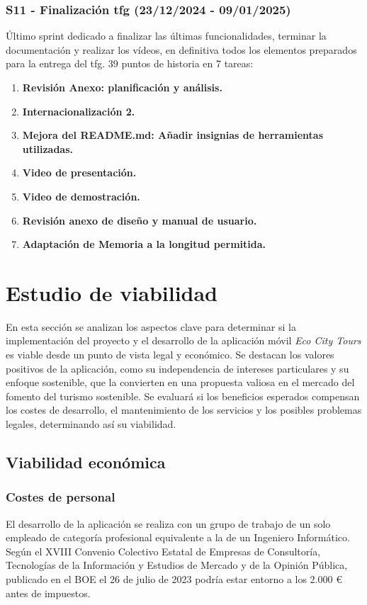 \subsubsection{S11 - Finalización \acrshort{tfg} (23/12/2024 - 09/01/2025)}
Último sprint dedicado a finalizar las últimas funcionalidades, terminar la documentación y realizar los vídeos, en definitiva todos los elementos preparados para la entrega del \acrfull{tfg}. 39 puntos de historia en 7 tareas:
\begin{enumerate}
	\item \textbf{Revisión Anexo: planificación y análisis.}
	\item \textbf{Internacionalización 2.}
	\item \textbf{Mejora del README.md: Añadir insignias de herramientas utilizadas.}
	\item \textbf{Video de presentación.}
	\item \textbf{Video de demostración.}
	\item \textbf{Revisión anexo de diseño y manual de usuario.}
	\item \textbf{Adaptación de Memoria a la longitud permitida.}
\end{enumerate}
\section{Estudio de viabilidad}
En esta sección se analizan los aspectos clave para determinar si la implementación del proyecto y el desarrollo de la aplicación móvil \textit{Eco City Tours} es viable desde un punto de vista legal y económico. Se destacan los valores positivos de la aplicación, como su independencia de intereses particulares y su enfoque sostenible, que la convierten en una propuesta valiosa en el mercado del fomento del turismo sostenible. Se evaluará si los beneficios esperados compensan los costes de desarrollo, el mantenimiento de los servicios y los posibles problemas legales, determinando así su viabilidad.
\subsection{Viabilidad económica}
\subsubsection{Costes de personal}
El desarrollo de la aplicación se realiza con un grupo de trabajo de un solo empleado de categoría profesional equivalente a la de un Ingeniero Informático. Según el XVIII Convenio Colectivo Estatal de Empresas de Consultoría, Tecnologías de la Información y Estudios de Mercado y de la Opinión Pública, publicado en el BOE el 26 de julio de 2023 \cite{boe2023_consultoria} podría estar entorno a los 2.000 € antes de impuestos.

